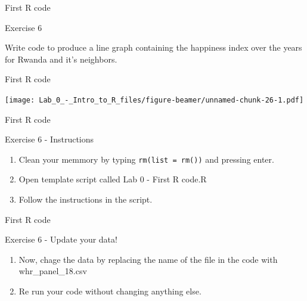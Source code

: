 \documentclass[ignorenonframetext,]{beamer}
\providecommand{\tightlist}{%
  \setlength{\itemsep}{0pt}\setlength{\parskip}{0pt}}
\begin{document}
\begin{frame}{First R code}

\begin{block}{Exercise 6}

Write code to produce a line graph containing the happiness index over
the years for Rwanda and it's neighbors.

\end{block}

\end{frame}

\begin{frame}{First R code}

\texttt{[image: Lab\_0\_-\_Intro\_to\_R\_files/figure-beamer/unnamed-chunk-26-1.pdf]}

\end{frame}

\begin{frame}[fragile]{First R code}

\begin{block}{Exercise 6 - Instructions}

\begin{enumerate}
\def\labelenumi{\arabic{enumi}.}
\tightlist
\item
  Clean your memmory by typing \texttt{rm(list\ =\ rm())} and pressing
  enter.
\item
  Open template script called Lab 0 - First R code.R
\item
  Follow the instructions in the script.
\end{enumerate}

\end{block}

\end{frame}

\begin{frame}{First R code}

\begin{block}{Exercise 6 - Update your data!}

\begin{enumerate}
\def\labelenumi{\arabic{enumi}.}
\tightlist
\item
  Now, chage the data by replacing the name of the file in the code with
  whr\_panel\_18.csv
\item
  Re run your code without changing anything else.
\end{enumerate}

\end{block}

\end{frame}
\end{document}
